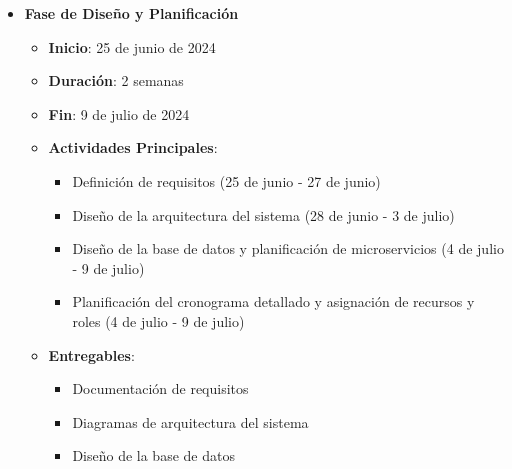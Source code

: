 \documentclass{article}
\begin{document}
\begin{itemize}
    \item \textbf{Fase de Diseño y Planificación}
          \begin{itemize}
              \item \textbf{Inicio}: 25 de junio de 2024
              \item \textbf{Duración}: 2 semanas
              \item \textbf{Fin}: 9 de julio de 2024
              \item \textbf{Actividades Principales}:
                    \begin{itemize}
                        \item Definición de requisitos (25 de junio - 27 de junio)
                        \item Diseño de la arquitectura del sistema (28 de junio - 3 de julio)
                        \item Diseño de la base de datos y planificación de microservicios (4 de julio - 9 de julio)
                        \item Planificación del cronograma detallado y asignación de recursos y roles (4 de julio - 9 de julio)
                    \end{itemize}
              \item \textbf{Entregables}:
                    \begin{itemize}
                        \item Documentación de requisitos
                        \item Diagramas de arquitectura del sistema
                        \item Diseño de la base de datos
                    \end{itemize}
          \end{itemize}


\end{itemize}
\end{document}
